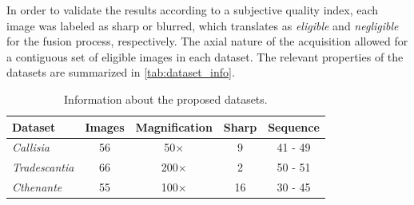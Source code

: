 In order to validate the results according to a subjective quality index, each image was labeled as sharp or blurred, which translates as \emph{eligible} and \emph{negligible} for the fusion process, respectively. The axial nature of the acquisition allowed for a contiguous set of eligible images in each dataset. The relevant properties of the datasets are summarized in \autoref{tab:dataset_info}. 

\begin{table}[ht]
    \centering
    \caption{Information about the proposed datasets.}
    \label{tab:dataset_info}
    \begin{tabular}{lcccc}
        \toprule
        \textbf{Dataset} & \textbf{Images} & \textbf{Magnification} & \textbf{Sharp} & \textbf{Sequence}\\
        \midrule
        \textit{Callisia} & 56 & 50$\times$ & 9 & 41 - 49\\
        \textit{Tradescantia} & 66 & 200$\times$ & 2 & 50 - 51\\
        \textit{Cthenante} & 55 & 100$\times$ & 16 & 30 - 45\\
        \bottomrule
    \end{tabular}
    \centering
    \fautor
\end{table}